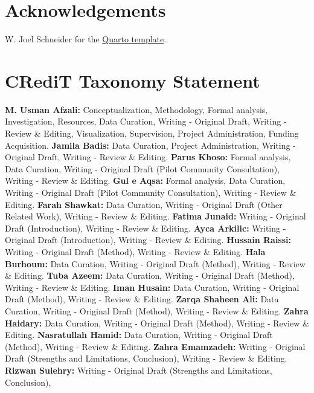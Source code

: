 \documentclass[
  man,
  longtable,
  nolmodern,
  notxfonts,
  notimes,
  colorlinks=true,linkcolor=blue,citecolor=blue,urlcolor=blue]{apa7}
\begin{document}
\newpage{}

\section{Acknowledgements}\label{acknowledgements}

W. Joel Schneider for the
\href{https://github.com/wjschne/apaquarto}{Quarto template}.

\newpage{}

\section{CRediT Taxonomy Statement}\label{credit-taxonomy-statement}

\textbf{M. Usman Afzali:} Conceptualization, Methodology, Formal
analysis, Investigation, Resources, Data Curation, Writing - Original
Draft, Writing - Review \& Editing, Visualization, Supervision, Project
Administration, Funding Acquisition. \textbf{Jamila Badis:} Data
Curation, Project Administration, Writing - Original Draft, Writing -
Review \& Editing. \textbf{Parus Khoso:} Formal analysis, Data Curation,
Writing - Original Draft (Pilot Community Consultation), Writing -
Review \& Editing. \textbf{Gul e Aqsa:} Formal analysis, Data Curation,
Writing - Original Draft (Pilot Community Consultation), Writing -
Review \& Editing. \textbf{Farah Shawkat:} Data Curation, Writing -
Original Draft (Other Related Work), Writing - Review \& Editing.
\textbf{Fatima Junaid:} Writing - Original Draft (Introduction), Writing
- Review \& Editing. \textbf{Ayca Arkilic:} Writing - Original Draft
(Introduction), Writing - Review \& Editing. \textbf{Hussain Raissi:}
Writing - Original Draft (Method), Writing - Review \& Editing.
\textbf{Hala Burhoum:} Data Curation, Writing - Original Draft (Method),
Writing - Review \& Editing. \textbf{Tuba Azeem:} Data Curation, Writing
- Original Draft (Method), Writing - Review \& Editing. \textbf{Iman
Husain:} Data Curation, Writing - Original Draft (Method), Writing -
Review \& Editing. \textbf{Zarqa Shaheen Ali:} Data Curation, Writing -
Original Draft (Method), Writing - Review \& Editing. \textbf{Zahra
Haidary:} Data Curation, Writing - Original Draft (Method), Writing -
Review \& Editing. \textbf{Nasratullah Hamid:} Data Curation, Writing -
Original Draft (Method), Writing - Review \& Editing. \textbf{Zahra
Emamzadeh:} Writing - Original Draft (Strengths and Limitations,
Conclusion), Writing - Review \& Editing. \textbf{Rizwan Sulehry:}
Writing - Original Draft (Strengths and Limitations, Conclusion),
\end{document}
